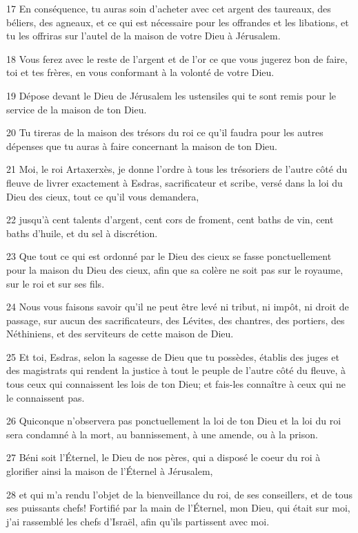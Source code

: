\par 17 En conséquence, tu auras soin d'acheter avec cet argent des taureaux, des béliers, des agneaux, et ce qui est nécessaire pour les offrandes et les libations, et tu les offriras sur l'autel de la maison de votre Dieu à Jérusalem.
\par 18 Vous ferez avec le reste de l'argent et de l'or ce que vous jugerez bon de faire, toi et tes frères, en vous conformant à la volonté de votre Dieu.
\par 19 Dépose devant le Dieu de Jérusalem les ustensiles qui te sont remis pour le service de la maison de ton Dieu.
\par 20 Tu tireras de la maison des trésors du roi ce qu'il faudra pour les autres dépenses que tu auras à faire concernant la maison de ton Dieu.
\par 21 Moi, le roi Artaxerxès, je donne l'ordre à tous les trésoriers de l'autre côté du fleuve de livrer exactement à Esdras, sacrificateur et scribe, versé dans la loi du Dieu des cieux, tout ce qu'il vous demandera,
\par 22 jusqu'à cent talents d'argent, cent cors de froment, cent baths de vin, cent baths d'huile, et du sel à discrétion.
\par 23 Que tout ce qui est ordonné par le Dieu des cieux se fasse ponctuellement pour la maison du Dieu des cieux, afin que sa colère ne soit pas sur le royaume, sur le roi et sur ses fils.
\par 24 Nous vous faisons savoir qu'il ne peut être levé ni tribut, ni impôt, ni droit de passage, sur aucun des sacrificateurs, des Lévites, des chantres, des portiers, des Néthiniens, et des serviteurs de cette maison de Dieu.
\par 25 Et toi, Esdras, selon la sagesse de Dieu que tu possèdes, établis des juges et des magistrats qui rendent la justice à tout le peuple de l'autre côté du fleuve, à tous ceux qui connaissent les lois de ton Dieu; et fais-les connaître à ceux qui ne le connaissent pas.
\par 26 Quiconque n'observera pas ponctuellement la loi de ton Dieu et la loi du roi sera condamné à la mort, au bannissement, à une amende, ou à la prison.
\par 27 Béni soit l'Éternel, le Dieu de nos pères, qui a disposé le coeur du roi à glorifier ainsi la maison de l'Éternel à Jérusalem,
\par 28 et qui m'a rendu l'objet de la bienveillance du roi, de ses conseillers, et de tous ses puissants chefs! Fortifié par la main de l'Éternel, mon Dieu, qui était sur moi, j'ai rassemblé les chefs d'Israël, afin qu'ils partissent avec moi.


